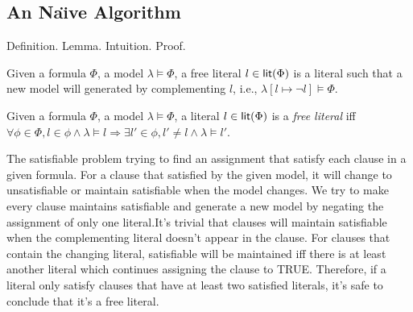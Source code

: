\medskip




\subsection{An Na\"{\i}ve Algorithm}
Definition.  Lemma.  Intuition. Proof.
\begin{definition}
Given a formula $\Phi$, a model $\lambda\models\Phi$, a free literal $l\in\textsf{lit}(\Phi)$ is a literal such that a new model will generated by complementing $l$, i.e., $\lambda[l\mapsto\neg l]\models\Phi$.
\end{definition}

\begin{lemma}
Given a formula $\Phi$, a model $\lambda\models\Phi$, a literal $l\in\textsf{lit}(\Phi)$ is a \emph{free literal} iff $\forall\phi\in\Phi, l\in\phi\wedge\lambda\models l \Longrightarrow \exists l'\in\phi, l'\neq l\wedge\lambda\models l'$.
\end{lemma}

The satisfiable problem trying to find an assignment that satisfy each clause in a given formula. For a clause that satisfied by the given model, it will change to unsatisfiable or maintain satisfiable when the model changes. We try to make every clause maintains satisfiable and generate a new model by negating the assignment of only one literal.It's trivial that clauses will maintain satisfiable when the complementing literal doesn't appear in the clause. For clauses that contain the changing literal, satisfiable will be maintained iff there is at least another literal which continues assigning the clause to TRUE. Therefore, if a literal only satisfy clauses that have at least two satisfied literals, it's safe to conclude that it's a free literal.

